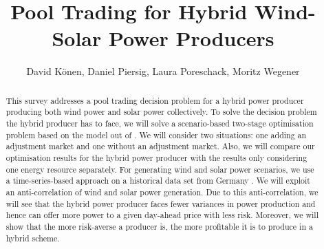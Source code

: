 \documentclass[11pt]{scrartcl}
\title{Pool Trading for Hybrid Wind-Solar Power Producers}
\author{David K\"onen, Daniel Piersig, Laura Poreschack, Moritz Wegener  }  %
\begin{document}
\maketitle

\begin{abstract}
		This survey addresses a pool trading decision problem for a hybrid power producer producing both wind power and solar power collectively. To solve the decision problem the hybrid producer has to face, we will solve a scenario-based two-stage optimisation problem based on the model out of \cite{Conejo10}. We will consider two situations: one adding an adjustment market and one without an adjustment market. Also, we will compare our optimisation results for the hybrid power producer with the results only considering one energy resource separately.  For generating wind and solar power scenarios, we use a time-series-based approach on a historical data set from Germany \cite{url}. We will exploit an anti-correlation of wind and solar power generation. Due to this anti-correlation, we will see that the hybrid power producer faces fewer variances in power production and hence can offer more power  to a given day-ahead price with less risk. Moreover, we will show that the more risk-averse a producer is, the more profitable it is to produce in a hybrid scheme. 
\end{abstract}

 
 
 
 


 

 
  
 

 
 
\end{document}
